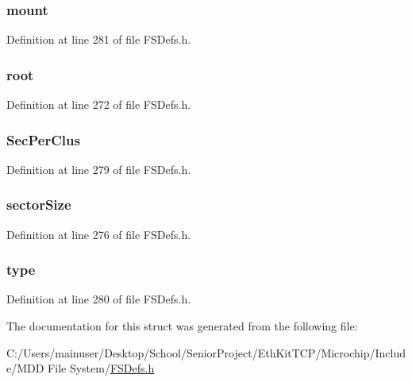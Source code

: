 \subsubsection[{mount}]{ mount}\label{struct_d_i_s_k_aaff6041e51154e6e228bbaba9d97a296}


Definition at line 281 of file F\+S\+Defs.\+h.

\hypertarget{struct_d_i_s_k_ad1dbc97d66e5ae1004b8e1b85bd3530a}{}
\subsubsection[{root}]{ root}\label{struct_d_i_s_k_ad1dbc97d66e5ae1004b8e1b85bd3530a}


Definition at line 272 of file F\+S\+Defs.\+h.

\hypertarget{struct_d_i_s_k_a1f0f19ff97474a54f8efe3eb6a9d8111}{}
\subsubsection[{Sec\+Per\+Clus}]{ Sec\+Per\+Clus}\label{struct_d_i_s_k_a1f0f19ff97474a54f8efe3eb6a9d8111}


Definition at line 279 of file F\+S\+Defs.\+h.

\hypertarget{struct_d_i_s_k_a1cde99d3fb7daeacb3c397df7fe91cbc}{}
\subsubsection[{sector\+Size}]{ sector\+Size}\label{struct_d_i_s_k_a1cde99d3fb7daeacb3c397df7fe91cbc}


Definition at line 276 of file F\+S\+Defs.\+h.

\hypertarget{struct_d_i_s_k_aab7cf12125f16245546ef7411994ebb9}{}
\subsubsection[{type}]{ type}\label{struct_d_i_s_k_aab7cf12125f16245546ef7411994ebb9}


Definition at line 280 of file F\+S\+Defs.\+h.



The documentation for this struct was generated from the following file\+:\begin{DoxyCompactItemize}
\item 
C\+:/\+Users/mainuser/\+Desktop/\+School/\+Senior\+Project/\+Eth\+Kit\+T\+C\+P/\+Microchip/\+Include/\+M\+D\+D File System/\hyperlink{_f_s_defs_8h}{F\+S\+Defs.\+h}\end{DoxyCompactItemize}
